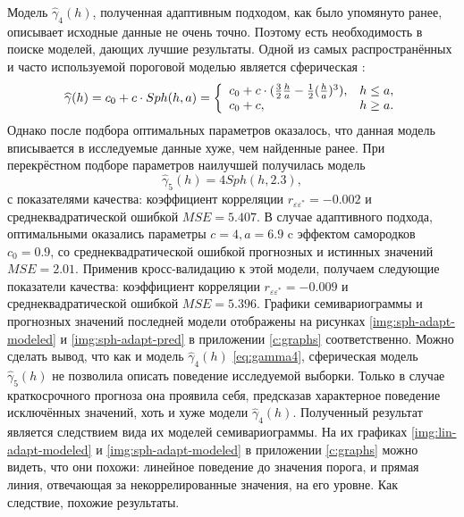Модель $ \widehat{\gamma}_4(h) $, полученная адаптивным подходом, как было упомянуто ранее, описывает исходные данные не очень точно. Поэтому есть необходимость в поиске моделей, дающих лучшие результаты. Одной из самых распространённых и часто используемой пороговой моделью является сферическая \cite{geostat2010}:
\begin{equation*}
	\widehat{\gamma}(h) = c_0 + c \cdot Sph(h, a) = \left\{
		\begin{array}{l l}
			c_0 + c \cdot (\frac{3}{2} \frac{h}{a} - \frac{1}{2}(\frac{h}{a})^3), & h \le a, \\
			c_0 + c, & h \geq a.
		\end{array} \right.
\end{equation*}
Однако после подбора оптимальных параметров оказалось, что данная модель вписывается в исследуемые данные хуже, чем найденные ранее. При перекрёстном подборе параметров наилучшей получилась модель
\begin{equation}
\label{eq:gamma5}
	\widehat{\gamma}_5(h) = 4 Sph(h, 2.3),
\end{equation} %
с показателями качества: коэффициент корреляции $ r_{\varepsilon\varepsilon^{*}} = -0.002$ и среднеквадратической ошибкой $ MSE = 5.407$. В случае адаптивного подхода, оптимальными оказались параметры $ c = 4, a = 6.9 $ c эффектом самородков $ c_0 = 0.9 $, со среднеквадратической ошибкой прогнозных и истинных значений $ MSE = 2.01 $. Применив кросс-валидацию к этой модели, получаем следующие показатели качества: коэффициент корреляции $ r_{\varepsilon\varepsilon^{*}} = -0.009 $ и среднеквадратической ошибкой $ MSE = 5.396 $. Графики семивариограммы и прогнозных значений последней модели отображены на рисунках \ref{img:sph-adapt-modeled} и \ref{img:sph-adapt-pred} в приложении \ref{c:graphs} соответственно. Можно сделать вывод, что как и модель $ \widehat{\gamma}_4(h) $ \eqref{eq:gamma4}, сферическая модель $ \widehat{\gamma}_5(h) $ не позволила описать поведение исследуемой выборки. Только в случае краткосрочного прогноза она проявила себя, предсказав характерное поведение исключённых значений, хоть и хуже модели $ \widehat{\gamma}_4(h) $. Полученный результат является следствием вида их моделей семивариограммы. На их графиках \ref{img:lin-adapt-modeled} и \ref{img:sph-adapt-modeled} в приложении \ref{c:graphs} можно видеть, что они похожи: линейное поведение до значения порога, и прямая линия, отвечающая за некоррелированные значения, на его уровне. Как следствие, похожие результаты.

